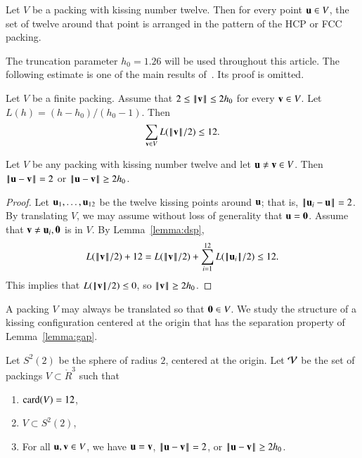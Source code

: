 \documentclass{llncs}
\begin{document}
%


\begin{theorem}\label{thm:fc} 
  Let $V$ be a packing with kissing number twelve.  Then for every point $\u\in
  V$, the set of twelve around that point is arranged in the pattern
  of the HCP or FCC packing.
\end{theorem}
%
%
%

The truncation parameter $h_0=1.26$ will be used throughout this article.
The following estimate is one of the main results of~\cite{DSP}.  Its proof
is omitted.

\begin{lemma}\label{lemma:dsp}
Let $V$ be a finite packing.  Assume that $2\le \normo{\v}\le 2h_0$ for
every $\v\in V$.  Let $L(h) = (h-h_0)/(h_0-1)$.  Then
\[
\sum_{\v\in V} L(\normo{\v}/2) \le 12.
\]
\end{lemma}

\begin{lemma} \label{lemma:gap}
  Let $V$ be any packing with kissing number twelve and let $\u\ne\v\in V$.
  Then $\norm{\u}{\v}=2$ or $\norm{\u}{\v} \ge 2h_0$.
\end{lemma}


\begin{proof} Let $ \u_1,\ldots, \u_{12}$ be the twelve kissing points
  around $\u$; that is, $\norm{\u_i}{\u}=2$.  
By translating $V$, we may assume without
loss of generality that $\u=\orz$.  Assume that $\v\ne \u_i,\orz$ is in $V$.   
By Lemma~\ref{lemma:dsp},
\[
   L(\normo{\v}/2)  + 12 
  =  L(\normo{\v}/2) + \sum_{i=1}^{12} L(\normo{\u_i}/2)  \le 12.
\]
This implies that $L(\normo{\v}/2)\le 0$, so $\normo{ \v}\ge 2h_0$.
\end{proof}

A packing $V$ may always be translated so that $\orz\in V$.  We study
the structure of a kissing configuration centered at the origin that
has the separation property of Lemma~\ref{lemma:gap}.

\begin{definition}[$S^2(2)$,~$\CalV$]
  Let $S^2(2)$ be the sphere of radius $2$, centered at the origin.  Let
  $\CalV$ be the set of packings $V\subset \ring{R}^3$ such that
\begin{enumerate}\wasitemize 
\item $\card(V) = 12$,
\item $V\subset S^2(2)$,
\item For all $\u,\v\in V$, we have $\u=\v$, $\norm{\u}{\v}=2$,
or $\norm{\u}{\v}\ge 2h_0$.
\end{enumerate}\wasitemize 
{}%
%
\end{definition}
\end{document}
